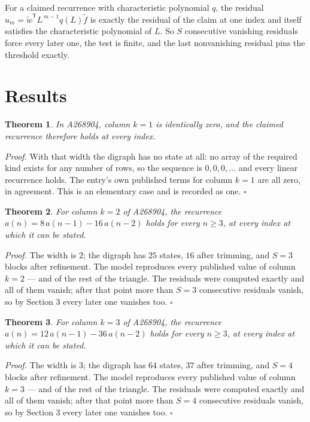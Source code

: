 \documentclass[11pt]{article}
\newtheorem{theorem}{Theorem}
\theoremstyle{definition}
\begin{document}
For a claimed recurrence with characteristic polynomial $q$, the residual $u_m = \tilde w^{\mathsf T}L^{\,m-1}q(L)\tilde f$ is exactly the residual of the claim at one index and itself satisfies the characteristic polynomial of $L$. So $S$ consecutive vanishing residuals force every later one, the test is finite, and the last nonvanishing residual pins the threshold exactly.

\section{Results}

\begin{theorem} In A268904, column $k = 1$ is identically zero, and the claimed recurrence therefore holds at every index.\end{theorem}

{\itshape Proof.} With that width the digraph has no state at all: no array of the required kind exists for any number of rows, so the sequence is $0,0,0,\dots$ and every linear recurrence holds. The entry's own published terms for column $k = 1$ are all zero, in agreement. This is an elementary case and is recorded as one. $\square$

\begin{theorem} For column $k = 2$ of A268904, the recurrence $a(n) = 8\,a(n-1) - 16\,a(n-2)$ holds for every $n \ge 3$, at every index at which it can be stated.\end{theorem}

{\itshape Proof.} The width is $2$; the digraph has $25$ states, $16$ after trimming, and $S = 3$ blocks after refinement. The model reproduces every published value of column $k = 2$ --- and of the rest of the triangle. The residuals were computed exactly and all of them vanish; after that point more than $S = 3$ consecutive residuals vanish, so by Section 3 every later one vanishes too. $\square$

\begin{theorem} For column $k = 3$ of A268904, the recurrence $a(n) = 12\,a(n-1) - 36\,a(n-2)$ holds for every $n \ge 3$, at every index at which it can be stated.\end{theorem}

{\itshape Proof.} The width is $3$; the digraph has $64$ states, $37$ after trimming, and $S = 4$ blocks after refinement. The model reproduces every published value of column $k = 3$ --- and of the rest of the triangle. The residuals were computed exactly and all of them vanish; after that point more than $S = 4$ consecutive residuals vanish, so by Section 3 every later one vanishes too. $\square$
\end{document}
